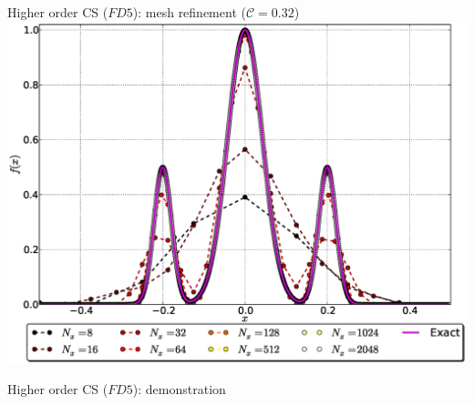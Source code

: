 \documentclass{beamer}
\begin{document}

\begin{frame}{Higher order CS ($FD5$): mesh refinement ($\mathcal{C} = 0.32$)}\vspace{-0.2em}
    \includegraphics[width=\textwidth]{graphics/plot_-_GB3_FD5_Nxall_dashdot_w_Nx2048}
 
\end{frame}


\begin{frame}{Higher order CS ($FD5$): demonstration}


\end{frame}

\end{document}
